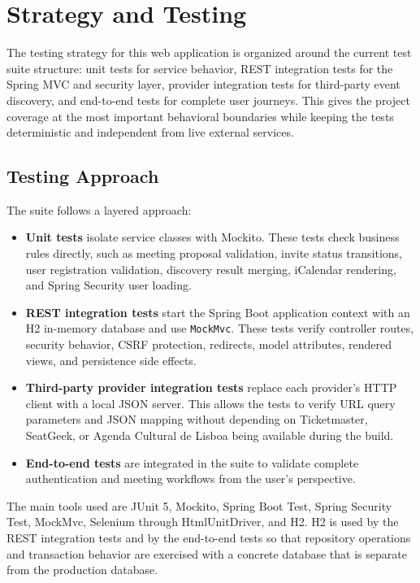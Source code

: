 \chapter{Strategy and Testing} \label{cap:testing}

The testing strategy for this web application is organized around the current test suite structure: unit tests for service behavior, REST integration tests for the Spring MVC and security layer, provider integration tests for third-party event discovery, and end-to-end tests for complete user journeys. This gives the project coverage at the most important behavioral boundaries while keeping the tests deterministic and independent from live external services.

\section{Testing Approach}

The suite follows a layered approach:
\begin{itemize}
    \item \textbf{Unit tests} isolate service classes with Mockito. These tests check business rules directly, such as meeting proposal validation, invite status transitions, user registration validation, discovery result merging, iCalendar rendering, and Spring Security user loading.
    \item \textbf{REST integration tests} start the Spring Boot application context with an H2 in-memory database and use \texttt{MockMvc}. These tests verify controller routes, security behavior, CSRF protection, redirects, model attributes, rendered views, and persistence side effects.
    \item \textbf{Third-party provider integration tests} replace each provider's HTTP client with a local JSON server. This allows the tests to verify URL query parameters and JSON mapping without depending on Ticketmaster, SeatGeek, or Agenda Cultural de Lisboa being available during the build.
    \item \textbf{End-to-end tests} are integrated in the suite to validate complete authentication and meeting workflows from the user's perspective.
\end{itemize}

The main tools used are JUnit 5, Mockito, Spring Boot Test, Spring Security Test, MockMvc, Selenium through HtmlUnitDriver, and H2. H2 is used by the REST integration tests and by the end-to-end tests so that repository operations and transaction behavior are exercised with a concrete database that is separate from the production database.

